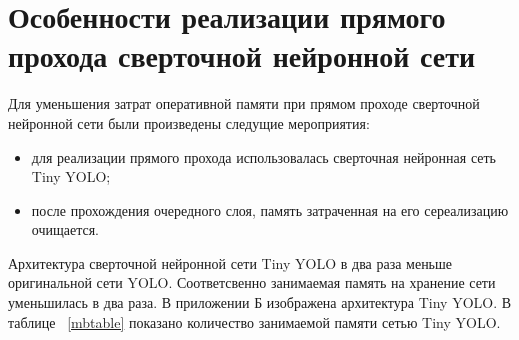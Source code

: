 \documentclass[a4paper,english,russian]{G2-105}
\begin{document}
\section{Особенности реализации прямого прохода сверточной нейронной сети} \ttl
\par Для уменьшения затрат оперативной памяти при прямом проходе сверточной нейронной сети были произведены следущие мероприятия:
\begin{itemize}
\item для реализации прямого прохода использовалась сверточная нейронная сеть Tiny YOLO;
\item после прохождения очередного слоя, память затраченная на его сереализацию очищается.
\end{itemize}
\par Архитектура сверточной нейронной сети Tiny YOLO в два раза меньше оригинальной сети YOLO. Соответсвенно занимаемая память на хранение сети уменьшилась в два раза. В приложении Б изображена архитектура Tiny YOLO. В таблице ~\ref{mbtable} показано количество занимаемой памяти сетью Tiny YOLO.
\end{document}

